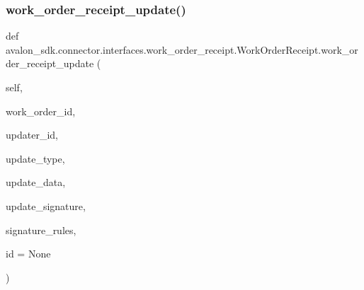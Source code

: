 \subsubsection{\texorpdfstring{work\+\_\+order\+\_\+receipt\+\_\+update()}{work\_order\_receipt\_update()}\hspace{0.1cm}{\footnotesize\ttfamily [2/2]}}
{\footnotesize\ttfamily def avalon\+\_\+sdk.\+connector.\+interfaces.\+work\+\_\+order\+\_\+receipt.\+Work\+Order\+Receipt.\+work\+\_\+order\+\_\+receipt\+\_\+update (\begin{DoxyParamCaption}\item[{}]{self,  }\item[{}]{work\+\_\+order\+\_\+id,  }\item[{}]{updater\+\_\+id,  }\item[{}]{update\+\_\+type,  }\item[{}]{update\+\_\+data,  }\item[{}]{update\+\_\+signature,  }\item[{}]{signature\+\_\+rules,  }\item[{}]{id = {\ttfamily None} }\end{DoxyParamCaption})}

